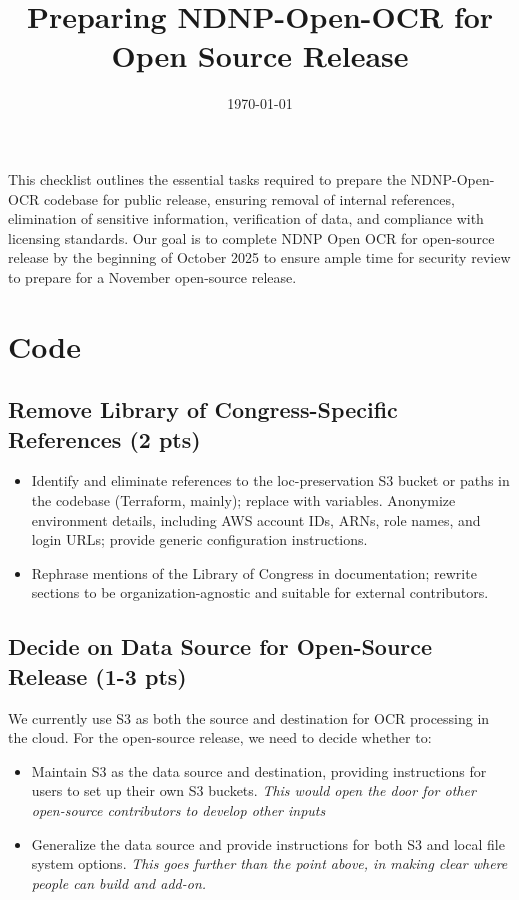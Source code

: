 \documentclass{article}
\title{Preparing NDNP-Open-OCR for Open Source Release}
\author{}
\date{\today}
\begin{document}
\maketitle

This checklist outlines the essential tasks required to prepare the NDNP-Open-OCR codebase for public release, ensuring removal of internal references, elimination of sensitive information, verification of data, and compliance with licensing standards. Our goal is to complete NDNP Open OCR for open-source release by the beginning of October 2025 to ensure ample time for security review to prepare for a November open-source release.

\section {Code}

\subsection{Remove Library of Congress-Specific References (2 pts)}

\begin{itemize}[label=$\square$]
    \item Identify and eliminate references to the loc-preservation S3 bucket or paths in the codebase (Terraform, mainly); replace with variables. Anonymize environment details, including AWS account IDs, ARNs, role names, and login URLs; provide generic configuration instructions.

    \item Rephrase mentions of the Library of Congress in documentation; rewrite sections to be organization-agnostic and suitable for external contributors.
\end{itemize}

\subsection{Decide on Data Source for Open-Source Release (1-3 pts)}
We currently use S3 as both the source and destination for OCR processing in the cloud. For the open-source release, we need to decide whether to:
\begin{itemize}[label=$\square$]
    \item Maintain S3 as the data source and destination, providing instructions for users to set up their own S3 buckets. \textit{This would open the door for other open-source contributors to develop other inputs}
    \item Generalize the data source and provide instructions for both S3 and local file system options. \textit{This goes further than the point above, in making clear where people can build and add-on.}
\end{itemize}
\end{document}
